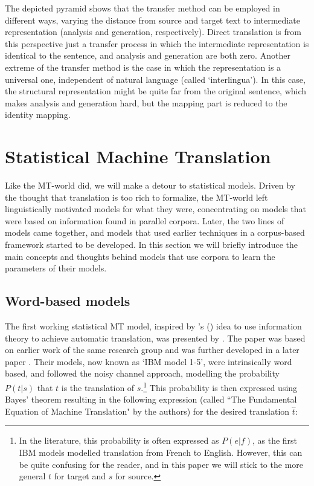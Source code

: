 \documentclass[a4paper, 11pt]{report}
\theoremstyle{definition}
\theoremstyle{plain}
\def\citepos#1{\citeauthor{#1}'s (\citeyear{#1})}
\begin{document}
The depicted pyramid shows that the transfer method can be employed in different ways, varying the distance from source and target text to intermediate representation (analysis and generation, respectively). Direct translation is from this perspective just a transfer process in which the intermediate representation is identical to the sentence, and analysis and generation are both zero. Another extreme of the transfer method is the case in which the representation is a universal one, independent of natural language (called `interlingua'). In this case, the structural representation might be quite far from the original sentence, which makes analysis and generation hard, but the mapping part is reduced to the identity mapping.

\section{Statistical Machine Translation}
\label{sec:SMT}

Like the MT-world did, we will make a detour to statistical models. Driven by the thought that translation is too rich to formalize, the MT-world left linguistically motivated models for what they were, concentrating on models
that were based on information found in parallel corpora. Later, the two lines of models came together, and models that used earlier techniques in a corpus-based framework started to be developed. In this section we will briefly introduce the main concepts and thoughts behind models that use corpora to learn the parameters of their models.

\subsection{Word-based models}
The first working statistical MT model, inspired by \citepos{weaver1955translation} idea to use information theory to achieve automatic translation, was presented by \cite{brown1990statistical}. The paper was based on earlier work of the same research group \citep{brown1988statistical} and was further developed in a later paper \citep{brown1993mathematics}. Their models, now known as `IBM model 1-5', were intrinsically word based, and followed the noisy channel approach, modelling the probability $P(t|s)$ that $t$ is the translation of $s$.\footnote{In the literature, this probability is often expressed as $P(e|f)$, as the first IBM models modelled translation from French to English. However, this can be quite confusing for the reader, and in this paper we will stick to the more general $t$ for target and $s$ for source.} This probability is then expressed using Bayes' theorem resulting in the following expression (called ``The Fundamental Equation of Machine Translation" by the authors) for the desired translation $\hat{t}$:
\end{document}
